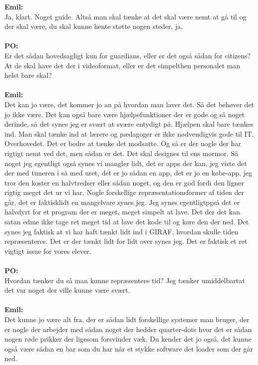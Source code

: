 \textbf{Emil:}\\
Ja, klart.
Noget guide.
Altså man skal tænke at det skal være nemt at gå til og der skal være, du skal kunne hente støtte nogen steder, ja.
\\\\
\textbf{PO:}\\
Er det sådan hovedsagligt kun for guardians, eller er det også sådan for citizens? At de skal have det der i videoformat, eller er det simpelthen personalet man helst bare skal?
\\\\
\textbf{Emil:}\\
Det kan jo være, det kommer jo an på hvordan man laver det.
Så det behøver det jo ikke være.
Det kan også bare være hjælpefunktioner der er gode og så noget derinde, så det synes jeg er svært at svære entydigt på.
Hjælpen skal bare tænkes ind.
Man skal tænke ind at lærere og pædagoger er ikke nødvendigvis gode til IT.
Overhovedet.
Det er bedre at tænke det modsatte. 
Og så er der nogle der har rigtigt nemt ved det, men sådan er det.
Det skal designes til ens mormor.
Så noget jeg egentligt også synes vi mangler lidt, det er apps der kan, jeg viste det der med timeren i så med uret, det er jo sådan en app, det er jo en købe-app, jeg tror den koster en halvtredser eller sådan noget, og den er god fordi den ligner rigtig meget det ur vi har.
Nogle forskellige repræsentationsformer af tiden der går, det er faktisklidt en mangelvare synes jeg.    
Jeg synes egentligtpgså det er halvdyrt for et program der er meget, meget simpelt at lave. 
Det der det kan satan edme ikke tage ret meget tid at lave det kode til og køre den der ned.
Det synes jeg faktisk at vi har haft tænkt lidt ind i GIRAF, hvordan skulle tiden repræsenteres.
Det er der tænkt lidt for lidt over synes jeg.  
Det er faktisk et ret vigtigt issue for vores elever. 
\\\\
\textbf{PO:}\\
Hvordan tænker du så man kunne repræsentere tid? 
Jeg tænker umiddelbartat det var noget der ville kunne være svært.
\\\\
\textbf{Emil:}\\
Det kunne jo være alt fra, der er sådan lidt forskellige systemer man bruger, der er nogle der arbejder med sådan noget der hedder quarter-dots hvor det er sådan nogen røde prikker der ligesom forsvinder væk.
Du kender det jo også, det kunne også være sådan en bar som du har når et stykke software det loader som der går ned.    
